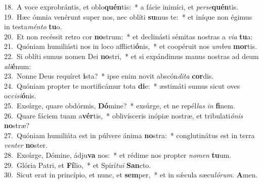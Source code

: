 {18.~}A voce exprobrántis, et oblo\textbf{quén}tis:~* a fácie inimíci, et \textit{per}\textit{se}\textbf{quén}tis.\\
{19.~}Hæc ómnia venérunt super nos, nec oblíti \textbf{su}mus te:~* et iníque non égimus in testa\textit{mén}\textit{to} \textbf{tu}o.\\
{20.~}Et non recéssit retro cor \textbf{no}strum:~* et declinásti sémitas nostras a \textit{vi}\textit{a} \textbf{tu}a:\\
{21.~}Quóniam humiliásti nos in loco afflicti\textbf{ó}nis,~* et coopéruit nos \textit{um}\textit{bra} \textbf{mor}tis.\\
{22.~}Si oblíti sumus nomen Dei \textbf{no}stri,~* et si expándimus manus nostras ad deum \textit{a}\textit{li}\textbf{é}num:\\
{23.~}Nonne Deus requíret \textbf{i}sta?~* ipse enim novit abscón\textit{di}\textit{ta} \textbf{cor}dis.\\
{24.~}Quóniam propter te mortificámur tota \textbf{di}e:~* æstimáti sumus sicut oves oc\textit{ci}\textit{si}\textbf{ó}nis.\\
{25.~}Exsúrge, quare obdórmis, \textbf{Dó}mine?~* exsúrge, et ne repél\textit{las} \textit{in} \textbf{fi}nem.\\
{26.~}Quare fáciem tuam a\textbf{vér}tis,~* oblivísceris inópiæ nostræ, et tribulati\textit{ó}\textit{nis} \textbf{no}stræ?\\
{27.~}Quóniam humiliáta est in púlvere ánima \textbf{no}stra:~* conglutinátus est in terra \textit{ven}\textit{ter} \textbf{no}ster.\\
{28.~}Exsúrge, Dómine, ádju\textbf{va} nos:~* et rédime nos propter \textit{no}\textit{men} \textbf{tu}um.\\
{29.~}Glória Patri, et \textbf{Fí}lio,~* et Spirí\textit{tu}\textit{i} \textbf{San}cto.\\
{30.~}Sicut erat in princípio, et nunc, et \textbf{sem}per,~* et in sǽcula sæcu\textit{ló}\textit{rum}. \textbf{A}men.\\
